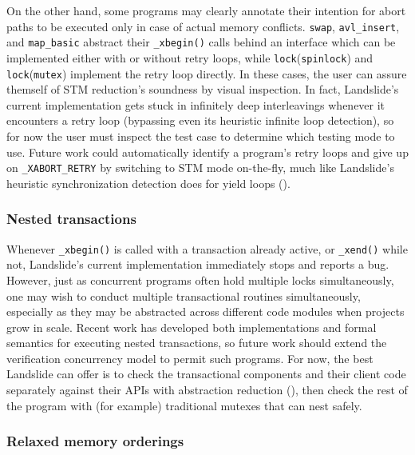 On the other hand, some programs may clearly annotate their intention
for abort paths to be executed only in case of actual memory conflicts.
{\tt swap}, {\tt avl\_insert}, and {\tt map\_basic} abstract their {\tt \_xbegin()} calls
behind an interface which can be implemented either with or without retry loops,
while {\tt lock}({\tt spinlock}) and {\tt lock}({\tt mutex}) implement the retry loop directly.
In these cases, the user can assure themself of STM reduction's soundness by visual inspection.
In fact, Landslide's current implementation gets stuck in infinitely deep interleavings
whenever it encounters a retry loop
(bypassing even its heuristic infinite loop detection),
so for now the user must inspect the test case to determine which testing mode to use.
Future work could automatically identify a program's retry loops
and give up on {\tt \_XABORT\_RETRY} by switching to STM mode on-the-fly,
much like Landslide's heuristic synchronization detection does for yield loops (\sect{\ref{sec:landslide-blocking}}).

\subsubsection{Nested transactions}
\label{sec:tm-warpzone-nested}

Whenever {\tt \_xbegin()} is called with a transaction already active, or {\tt \_xend()} while not,
Landslide's current implementation immediately stops and reports a bug.
However, just as concurrent programs often hold multiple locks simultaneously,
one may wish to conduct multiple transactional routines simultaneously,
especially as they may be abstracted across different code modules when projects grow in scale.
Recent work \cite{hybrid-htm-stm,relaxed-transactions-popl} has developed
both implementations and formal semantics for executing nested transactions,
so future work should extend the verification concurrency model to permit such programs.
For now, the best Landslide can offer is to check the transactional components and their client code
separately against their APIs
with abstraction reduction (\sect{\ref{sec:tm-abstraction}}),
then check the rest of the program with (for example) traditional mutexes that can nest safely.

\subsubsection{Relaxed memory orderings}
\label{sec:tm-warpzone-relaxed}

